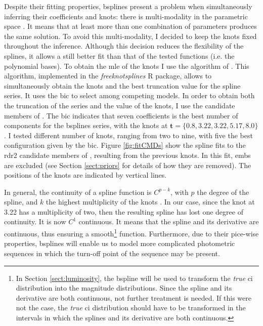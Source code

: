 Despite their fitting properties, \glspl{bspline} present a problem when simultaneously inferring their coefficients and knots: there is multi-modality in the parametric space \citep{Lindstrom1999}. It means that at least more than one combination of parameters produces the same solution. To avoid this multi-modality, I decided to keep the knots fixed throughout the inference. Although this decision reduces the flexibility of the splines, it allows a still better fit than that of the tested functions (i.e. the polynomial bases). To obtain the \gls{mle} of the knots I use the algorithm of  \citet{Spiriti2013}. This algorithm, implemented in the \emph{freeknotsplines} R package, allows to simultaneously obtain the knots and the best truncation value for the spline series. It uses the \gls{bic} to select among competing models. In order to obtain both the truncation of the series and the value of the knots, I use the candidate members of \citet{Bouy2015}. The \gls{bic} indicates that seven coefficients is the best number of components for the \glspl{bspline} series, with the knots at $\mathbf{t}=\{0.8,3.22,3.22,5.17,8.0\}$. I tested different number of knots, ranging from two to nine, with five the best configuration given by the \gls{bic}. Figure \ref{fig:fitCMDs} show the spline fits to the \gls{rdr2} candidate members of \citet{Bouy2015}, resulting from the previous knots. In this fit, \glspl{emb} are excluded (see Section \ref{sect:priors} for details of how they are removed). The positions of the knots are indicated by vertical lines.

In general, the continuity of a spline function is $C^{p-k}$, with $p$ the degree of the spline, and $k$ the highest multiplicity of the knots \citep{deBoor1978}. In our case, since the knot at 3.22 has a multiplicity of two, then the resulting spline has lost one degree of continuity. It is now $C^1$ continuous. It means that the spline and its derivative are continuous, thus ensuring a smooth\footnote{In Section \ref{sect:luminosity}, the \gls{bspline} will be used to transform the \emph{true} \gls{ci} distribution into the magnitude distributions. Since the spline and its derivative are both continuous, not further treatment is needed. If this were not the case, the \emph{true} \gls{ci} distribution should have to be transformed in the intervals in which the splines and its derivative are both continuous.} function. Furthermore, due to their pice-wise properties, \glspl{bspline} will enable us to model more complicated photometric sequences in which the turn-off point of the sequence may be present.

